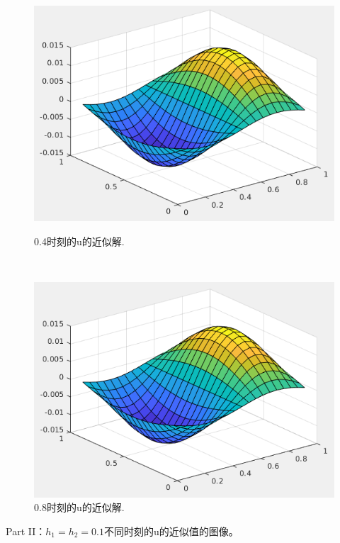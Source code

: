 \documentclass[12pt,a4paper]{article}
\begin{document}
\begin{figure}[ht]
	\begin{minipage}[t]{0.4\linewidth}%
		\centering     %
		\includegraphics[width=1.2\textwidth]{./figures/time04.png}
		\caption{0.4时刻的u的近似解.}%
		\label{fig:liuchengtu1}%
	\end{minipage} 
	\hfill
	\begin{minipage}[t]{0.4\linewidth}
		\centering
		\includegraphics[width=1.2\textwidth]{./figures/time08.png}
		\caption{0.8时刻的u的近似解.}%
		\label{fig:liuchengtu2}
	\end{minipage}
\end{figure}
\newpage
Part II：$h_1 = h_2 = 0.1$不同时刻的u的近似值的图像。
\end{document}
